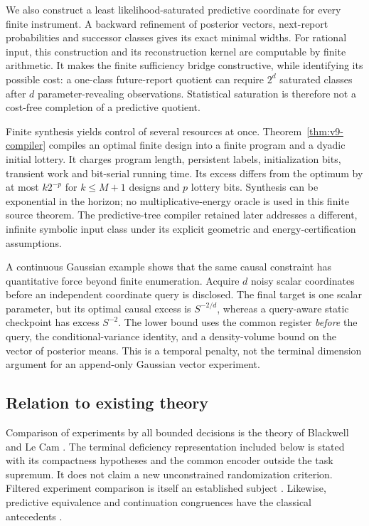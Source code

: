 We also construct a least likelihood-saturated predictive coordinate
for every finite instrument. A backward refinement of posterior vectors,
next-report probabilities and successor classes gives its exact minimal
widths. For rational input, this construction and its reconstruction
kernel are computable by finite arithmetic. It makes the finite
sufficiency bridge constructive, while identifying its possible cost:
a one-class future-report quotient can require $2^d$ saturated classes
after $d$ parameter-revealing observations. Statistical saturation is
therefore not a cost-free completion of a predictive quotient.

Finite synthesis yields control of several resources at once.
Theorem~\ref{thm:v9-compiler} compiles an optimal finite design into a
finite program and a dyadic initial lottery. It charges program length,
persistent labels, initialization bits, transient work and bit-serial
running time. Its excess differs from the optimum by at most $k2^{-p}$
for $k\le M+1$ designs and $p$ lottery bits. Synthesis can be exponential
in the horizon; no multiplicative-energy oracle is used in this finite
source theorem. The predictive-tree compiler retained later addresses
a different, infinite symbolic input class under its explicit geometric
and energy-certification assumptions.

A continuous Gaussian example shows that the same causal constraint has
quantitative force beyond finite enumeration. Acquire $d$ noisy scalar
coordinates before an independent coordinate query is disclosed. The
final target is one scalar parameter, but its optimal causal excess is
$S^{-2/d}$, whereas a query-aware static checkpoint has excess $S^{-2}$.
The lower bound uses the common register \emph{before} the query, the
conditional-variance identity, and a density-volume bound on the vector
of posterior means. This is a temporal penalty, not the terminal
dimension argument for an append-only Gaussian vector experiment.

\subsection{Relation to existing theory}
Comparison of experiments by all bounded decisions is the theory of
Blackwell and Le Cam \cite{Blackwell1953,LeCam1964,Torgersen1991}.
The terminal deficiency representation included below is stated with its
compactness hypotheses and the common encoder outside the task
supremum. It does not claim a new unconstrained randomization criterion.
Filtered experiment comparison is itself an established subject
\cite{Norberg2002}. Likewise, predictive equivalence and continuation
congruences have the classical antecedents
\cite{ShaliziCrutchfield2001,Nerode1958}.

